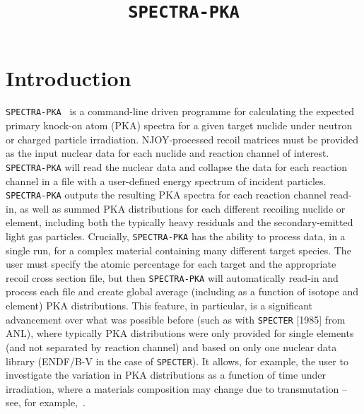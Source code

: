 \documentclass[a4paper]{article}
\begin{document}
\title{\texttt{SPECTRA-PKA}}

\maketitle
\section{Introduction}
\texttt{SPECTRA-PKA}~\cite{gilbertmariansublet2015,gilbertsubletNME2016,gilbertsublet2018} is a command-line driven programme for calculating the expected primary knock-on atom (PKA) spectra for a given target nuclide under neutron or charged particle irradiation. NJOY-processed recoil matrices must be provided as the input nuclear data for each nuclide and reaction channel of interest. \texttt{SPECTRA-PKA} will read the nuclear data and collapse the data for each reaction channel in a file with a user-defined energy spectrum of incident particles. \texttt{SPECTRA-PKA} outputs the resulting PKA spectra for each reaction channel read-in, as well as summed PKA distributions for each different recoiling nuclide or element, including both the typically heavy residuals and the secondary-emitted light gas particles. Crucially, \texttt{SPECTRA-PKA} has the ability to process data, in a single run, for a complex material containing many different target species. The user must specify the atomic percentage for each target and the appropriate recoil cross section file, but then \texttt{SPECTRA-PKA} will automatically read-in and process each file and create global average (including as a function of isotope and element) PKA distributions. This feature, in particular, is a significant advancement over what was possible before (such as with \texttt{SPECTER} [1985] from ANL), where typically PKA distributions were only provided for single elements (and not separated by reaction channel) and based on only one nuclear data library (ENDF/B-V in the case of \texttt{SPECTER}). It allows, for example, the user to investigate the variation in PKA distributions as a function of time under irradiation, where a materials composition may change due to transmutation -- see, for example,~\cite{gilbertsubletNME2016}.
\end{document}
